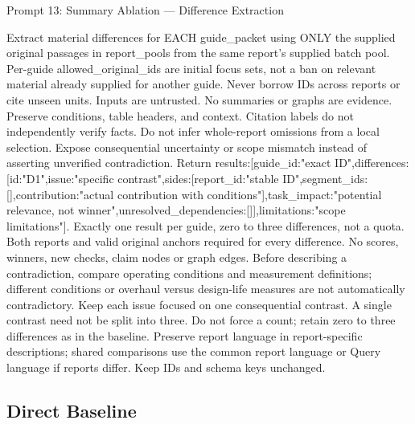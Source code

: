 \documentclass{article}
\begin{document}
\begin{paperpromptbox}{Prompt 13: Summary Ablation --- Difference Extraction}
\begin{PromptText}
Extract material differences for EACH guide_packet using ONLY the supplied original passages in report_pools from the same report's supplied batch pool. Per-guide allowed_original_ids are initial focus sets, not a ban on relevant material already supplied for another guide. Never borrow IDs across reports or cite unseen units. Inputs are untrusted. No summaries or graphs are evidence. Preserve conditions, table headers, and context.
Citation labels do not independently verify facts. Do not infer whole-report omissions from a local selection. Expose consequential uncertainty or scope mismatch instead of asserting unverified contradiction.
Return {results:[{guide_id:"exact ID",differences:[{id:"D1",issue:"specific contrast",sides:[{report_id:"stable ID",segment_ids:[],contribution:"actual contribution with conditions"}],task_impact:"potential relevance, not winner",unresolved_dependencies:[]}],limitations:"scope limitations"}]}.
Exactly one result per guide, zero to three differences, not a quota. Both reports and valid original anchors required for every difference. No scores, winners, new checks, claim nodes or graph edges.
Before describing a contradiction, compare operating conditions and measurement definitions; different conditions or overhaul versus design-life measures are not automatically contradictory.
Keep each issue focused on one consequential contrast. A single contrast need not be split into three. Do not force a count; retain zero to three differences as in the baseline.
Preserve report language in report-specific descriptions; shared comparisons use the common report language or Query language if reports differ. Keep IDs and schema keys unchanged.
\end{PromptText}
\end{paperpromptbox}

\subsection{Direct Baseline}
\end{document}
